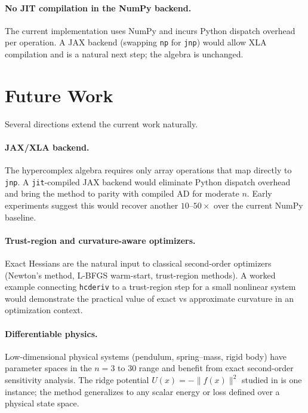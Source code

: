\paragraph{No JIT compilation in the NumPy backend.}
The current implementation uses NumPy and incurs Python dispatch overhead per
operation. A JAX backend (swapping \texttt{np} for \texttt{jnp}) would allow XLA
compilation and is a natural next step; the algebra is unchanged.



\section{Future Work}

Several directions extend the current work naturally.

\paragraph{JAX/XLA backend.}
The hypercomplex algebra requires only array operations that map directly to
\texttt{jnp}. A \texttt{jit}-compiled JAX backend would eliminate Python dispatch
overhead and bring the method to parity with compiled AD for moderate $n$. Early
experiments suggest this would recover another $10$--$50\times$ over the current
NumPy baseline.

\paragraph{Trust-region and curvature-aware optimizers.}
Exact Hessians are the natural input to classical second-order optimizers (Newton's
method, L-BFGS warm-start, trust-region methods). A worked example connecting
\texttt{hcderiv} to a trust-region step for a small nonlinear system would demonstrate
the practical value of exact vs approximate curvature in an optimization context.

\paragraph{Differentiable physics.}
Low-dimensional physical systems (pendulum, spring--mass, rigid body) have parameter
spaces in the $n = 3$ to $30$ range and benefit from exact second-order sensitivity
analysis. The ridge potential $U(x) = -\|f(x)\|^2$ studied in \citet{byte2026b} is
one instance; the method generalizes to any scalar energy or loss defined over a
physical state space.

